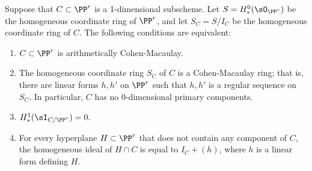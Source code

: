 \begin{proposition}\label{ACM basics}
Suppose that $C\subset \PP^r$ is a 1-dimensional subscheme. Let $S = H^0_*(\sO_{\PP^r})$
be the homogeneous coordinate ring of $\PP^r$, and let $S_C = S/I_C$ be the homogeneous
coordinate ring of $C$. The following conditions are equivalent:
\begin{enumerate}
 \item $C\subset \PP^r$ is arithmetically Cohen-Macaulay.
\item The homogeneous coordinate ring $S_C$ of $C$ is a Cohen-Macaulay ring; that is, there are linear forms $h,h'$ on $\PP^r$ such that $h, h'$ is a regular sequence
on $S_C$. In particular, $C$ has no 0-dimensional primary components.
\item $H^1_*(\sI_{C/\PP^r}) = 0.$
 \item For every hyperplane $H\subset \PP^r$ that does not contain any component of $C$,
 the homogeneous ideal of $H\cap C$
 is equal to  $I_C+(h)$, where $h$ is a linear form defining $H$.
\end{enumerate}
\end{proposition}
 
